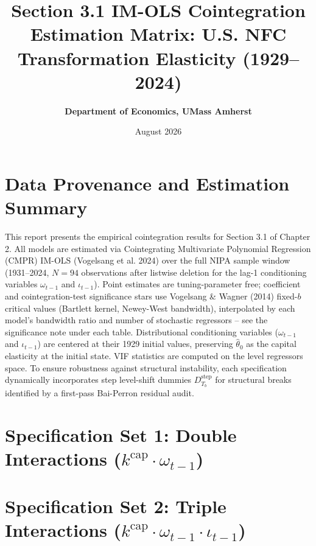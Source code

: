 \documentclass[11pt,a4paper]{article}
\title{\textbf{Section 3.1 IM-OLS Cointegration Estimation Matrix: U.S. NFC Transformation Elasticity (1929--2024)}}
\author{\textbf{Department of Economics, UMass Amherst}}
\date{August 2026}
\begin{document}
\maketitle

\section*{Data Provenance and Estimation Summary}
This report presents the empirical cointegration results for Section 3.1 of Chapter 2. All models are estimated via Cointegrating Multivariate Polynomial Regression (CMPR) IM-OLS (Vogelsang et al. 2024) over the full NIPA sample window (1931--2024, $N=94$ observations after listwise deletion for the lag-1 conditioning variables $\omega_{t-1}$ and $\iota_{t-1}$). Point estimates are tuning-parameter free; coefficient and cointegration-test significance stars use Vogelsang \& Wagner (2014) fixed-$b$ critical values (Bartlett kernel, Newey-West bandwidth), interpolated by each model's bandwidth ratio and number of stochastic regressors -- see the significance note under each table. Distributional conditioning variables ($\omega_{t-1}$ and $\iota_{t-1}$) are centered at their 1929 initial values, preserving $\hat{\theta}_0$ as the capital elasticity at the initial state. VIF statistics are computed on the level regressors space. To ensure robustness against structural instability, each specification dynamically incorporates step level-shift dummies $D^{\text{step}}_{T_b}$ for structural breaks identified by a first-pass Bai-Perron residual audit.

\FloatBarrier
\section{Specification Set 1: Double Interactions ($k^{\text{cap}} \cdot \omega_{t-1}$)}
\FloatBarrier


\FloatBarrier
\section{Specification Set 2: Triple Interactions ($k^{\text{cap}} \cdot \omega_{t-1} \cdot \iota_{t-1}$)}
\FloatBarrier


\FloatBarrier

\end{document}
